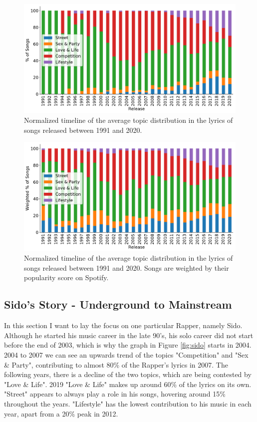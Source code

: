 \documentclass[conference]{IEEEtran}
\begin{document}
\begin{figure}[!t]
\includegraphics[width=\linewidth]{figures/timeline.pdf}
\vspace*{-8mm}
\caption{Normalized timeline of the average topic distribution in the lyrics of songs released between 1991 and 2020.}
\label{fig:timeline}
\end{figure}

\begin{figure}[!t]
\includegraphics[width=\linewidth]{figures/w_timeline.pdf}
\vspace*{-8mm}
\caption{Normalized timeline of the average topic distribution in the lyrics of songs released between 1991 and 2020. Songs are weighted by their popularity score on Spotify.}
\label{fig:w_timeline}
\end{figure}

\subsection{Sido's Story - Underground to Mainstream}
In this section I want to lay the focus on one particular Rapper, namely Sido. Although he started his music career in the late 90's, his solo career did not start before the end of 2003, which is why the graph in Figure \ref{fig:sido} starts in 2004. 2004 to 2007 we can see an upwards trend of the topics "Competition" and "Sex \& Party", contributing to almost 80\% of the Rapper's lyrics in 2007. The following years, there is a decline of the two topics, which are being contested by "Love \& Life". 2019 "Love \& Life" makes up around 60\% of the lyrics on its own. "Street" appears to always play a role in his songs, hovering around 15\% throughout the years. "Lifestyle" has the lowest contribution to his music in each year, apart from a 20\% peak in 2012.
\end{document}
